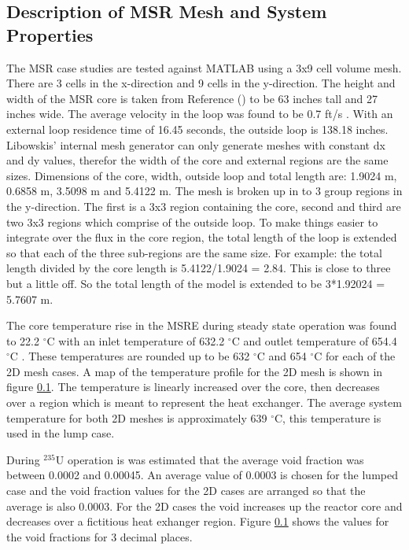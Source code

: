 \clearpage

\subsection{Description of MSR Mesh and System Properties}
The MSR case studies are tested against MATLAB using a 3x9 cell volume mesh. There are 3 cells in the x-direction and 9 cells in the y-direction. The height and width of the MSR core is taken from Reference (\cite{haubenreich1964}) to be 63 inches tall and 27 inches wide. The average velocity in the loop was found to be 0.7 ft/s \cite{kedl1972}. With an external loop residence time of 16.45 seconds, the outside loop is 138.18 inches. Libowskis' internal mesh generator can only generate meshes with constant dx and dy values, therefor the width of the core and external regions are the same sizes. Dimensions of the core, width, outside loop and total length are: 1.9024 m, 0.6858 m, 3.5098 m and 5.4122 m. The mesh is broken up in to 3 group regions in the y-direction. The first is a 3x3 region containing the core, second and third are two 3x3 regions which comprise of the outside loop. To make things easier to integrate over the flux in the core region, the total length of the loop is extended so that each of the three sub-regions are the same size. For example: the total length divided by the core length is 5.4122/1.9024 = 2.84. This is close to three but a little off. So the total length of the model is extended to be 3*1.92024 = 5.7607 m. 

The core temperature rise in the MSRE during steady state operation was found to 22.2 $^{\circ}$C with an inlet temperature of 632.2 $^{\circ}$C and outlet temperature of 654.4 $^{\circ}$C \cite{engel1962}. These temperatures are rounded up to be 632 $^{\circ}$C and 654 $^{\circ}$C for each of the 2D mesh cases. A map of the temperature profile for the 2D mesh is shown in figure \ref{}. The temperature is linearly increased over the core, then decreases over a region which is meant to represent the heat exchanger. The average system temperature for both 2D meshes is approximately 639 $^{\circ}$C, this temperature is used in the lump case. 

During $^{235}$U operation is was estimated that the average void fraction was between 0.0002 and 0.00045. An average value of 0.0003 is chosen for the lumped case and the void fraction values for the 2D cases are arranged so that the average is also 0.0003. For the 2D cases the void increases up the reactor core and decreases over a fictitious heat exhanger region. Figure \ref{} shows the values for the void fractions for 3 decimal places.  

